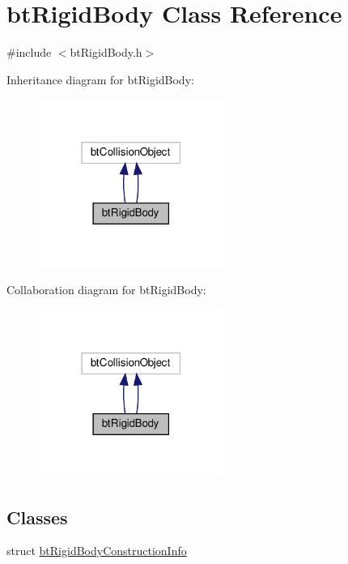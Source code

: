 \hypertarget{classbtRigidBody}{}\section{bt\+Rigid\+Body Class Reference}
\label{classbtRigidBody}


{\ttfamily \#include $<$bt\+Rigid\+Body.\+h$>$}



Inheritance diagram for bt\+Rigid\+Body\+:
\nopagebreak
\begin{figure}[H]
\begin{center}
\leavevmode
\includegraphics[width=171pt]{classbtRigidBody__inherit__graph}
\end{center}
\end{figure}


Collaboration diagram for bt\+Rigid\+Body\+:
\nopagebreak
\begin{figure}[H]
\begin{center}
\leavevmode
\includegraphics[width=171pt]{classbtRigidBody__coll__graph}
\end{center}
\end{figure}
\subsection*{Classes}
\begin{DoxyCompactItemize}
\item 
struct \hyperlink{structbtRigidBody_1_1btRigidBodyConstructionInfo}{bt\+Rigid\+Body\+Construction\+Info}
\end{DoxyCompactItemize}
